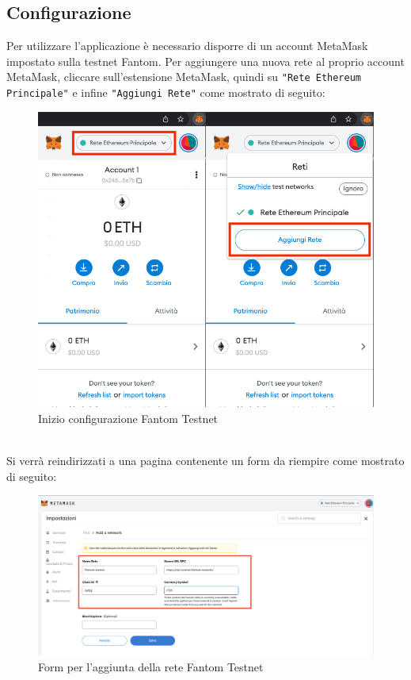 \subsection{Configurazione}
Per utilizzare l'applicazione \projectName{} è necessario disporre di un account MetaMask impostato sulla testnet Fantom.
Per aggiungere una nuova rete al proprio account MetaMask, cliccare sull'estensione MetaMask, quindi su \texttt{"Rete Ethereum Principale"}  e infine \texttt{"Aggiungi Rete"} come mostrato di seguito:
\begin{figure}[H]
    \centering
    \includegraphics[scale=0.4]{immagini/MetaMask/Configuration.png}
    \caption{Inizio configurazione Fantom Testnet}
\end{figure}
\textbf{}\\
Si verrà reindirizzati a una pagina contenente un form da riempire come mostrato di seguito:
\begin{figure}[H]
    \centering
    \includegraphics[scale=0.3]{immagini/MetaMask/ConfData.png}
    \caption{Form per l'aggiunta della rete Fantom Testnet}
\end{figure} 
